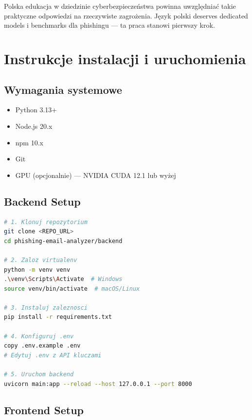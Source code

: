 \documentclass[11pt]{extreport}
\begin{document}
Polska edukacja w dziedzinie cyberbezpieczeństwa powinna uwzględniać takie praktyczne odpowiedzi na rzeczywiste zagrożenia. Język polski deserves dedicated models i benchmarks dla phishingu --- ta praca stanowi pierwszy krok.

\printbibliography[heading=bibintoc,title={Bibliografia}]

\appendix

\chapter{Instrukcje instalacji i uruchomienia}
\label{app:instalacja}

\section{Wymagania systemowe}

\begin{itemize}
    \item Python 3.13+
    \item Node.js 20.x
    \item npm 10.x
    \item Git
    \item GPU (opcjonalnie) --- NVIDIA CUDA 12.1 lub wyżej
\end{itemize}

\section{Backend Setup}

\begin{lstlisting}[language=bash, caption={Instalacja backendu}]
# 1. Klonuj repozytorium
git clone <REPO_URL>
cd phishing-email-analyzer/backend

# 2. Zaloz virtualenv
python -m venv venv
.\venv\Scripts\Activate  # Windows
source venv/bin/activate  # macOS/Linux

# 3. Instaluj zaleznosci
pip install -r requirements.txt

# 4. Konfiguruj .env
copy .env.example .env
# Edytuj .env z API kluczami

# 5. Uruchom backend
uvicorn main:app --reload --host 127.0.0.1 --port 8000
\end{lstlisting}

\section{Frontend Setup}
\end{document}
